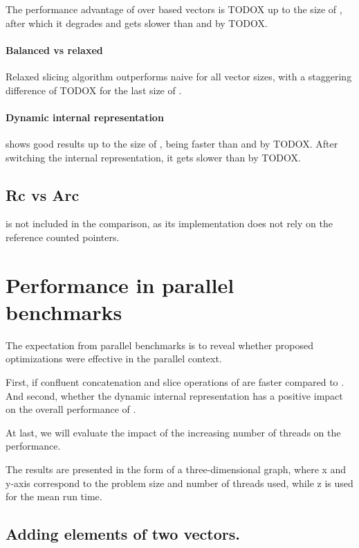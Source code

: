 The performance advantage of \stdvec{} over \rrbtree based vectors is TODOX up to the size of , after which it degrades and gets slower than \imrsvec{} and \rrbvec{} by TODOX. 

\paragraph{Balanced vs relaxed}
Relaxed slicing algorithm outperforms naive \rbvec{} for all vector sizes, with a staggering difference of TODOX for the last size of . 

\paragraph{Dynamic internal representation}
\pvec{} shows good results up to the size of , being faster than \rrbvec{} and \imrsvec{} by TODOX. After switching the internal representation, it gets slower than \rrbvec{} by TODOX. 

\subsection{Rc vs Arc}
\label{sec:perf-rc-vs-arc}
\stdvec{} is not included in the comparison, as its implementation does not rely on the reference counted pointers. 

\section{Performance in parallel benchmarks}
\label{sec:perf-par}

The expectation from parallel benchmarks is to reveal whether proposed optimizations were effective in the parallel context. 

First, if confluent concatenation and slice operations of \rrbvec{} are faster compared to \rbvec{}. And second, whether the dynamic internal representation has a positive impact on the overall performance of \pvec{}. 

At last, we will evaluate the impact of the increasing number of threads on the performance. 

The results are presented in the form of a three-dimensional graph, where x and y-axis correspond to the problem size and number of threads used, while z is used for the mean run time. 

\subsection{Adding elements of two vectors.} 

